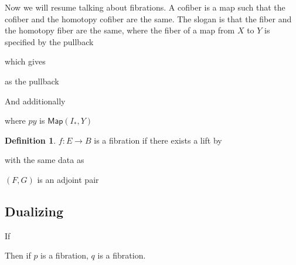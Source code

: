\documentclass[10pt]{article}
\theoremstyle{definition}
\newtheorem{definition}[theorem]{Definition}
\begin{document}
Now we will resume talking about fibrations. A cofiber is a map such that the cofiber and the homotopy cofiber are the same. The slogan is that the fiber and the homotopy fiber are the same, where the fiber of a map from $X$ to $Y$ is specified by the pullback\begin{center}
	 which gives 
	as the pullback
\end{center}
And additionally \begin{center}
\end{center}
where $py$ is $\mathsf{Map}(I_*,Y)$
\begin{definition}
	$f:E\to B$ is a fibration if there exists a lift by \begin{center}
		 with the same data as 
	\end{center}
\end{definition}
$(F,G)$ is an adjoint pair \begin{center}
\end{center}
\subsection{Dualizing}
If \begin{center}
\end{center}
Then if $p$ is a fibration, $q$ is a fibration. 
\end{document}

